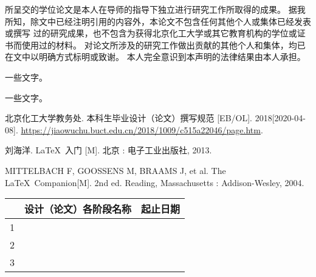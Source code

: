 \begin{declare}
	所呈交的学位论文是本人在导师的指导下独立进行研究工作所取得的成果。
	据我所知，除文中已经注明引用的内容外，本论文不包含任何其他个人或集体已经发表或撰写
	过的研究成果，也不包含为获得北京化工大学或其它教育机构的学位或证书而使用过的材料。
	对论文所涉及的研究工作做出贡献的其他个人和集体，均已在文中以明确方式标明或致谢。
	本人完全意识到本声明的法律结果由本人承担。
\end{declare}

\begin{taskbook}
\taskinfo		%
	
\taskitem			%
	一些文字。
	
\taskitem			%
	一些文字。
	
\taskitem			%
	\begin{bibenumerate}
		\item 北京化工大学教务处. 本科生毕业设计（论文）撰写规范 [EB/OL]. 2018[2020-04-08]. \url{https://jiaowuchu.buct.edu.cn/2018/1009/c515a22046/page.htm}.
		\item 刘海洋. \LaTeX\ 入门 [M]. 北京 : 电子工业出版社, 2013.
		\item MITTELBACH F, GOOSSENS M, BRAAMS J, et al. The \LaTeX\ Companion[M]. 2nd ed. Reading, Massachusetts : Addison-Wesley, 2004.
		\item 
	\end{bibenumerate}
	
\taskitem			%
	
	\begin{table}[ht]
		\centering
		\begin{tabularx}{.95\textwidth}{p{1.5em}Xp{6em}}
			\toprule
					& 	设计（论文）各阶段名称		  &		起止日期	\\\midrule
				1	& 								&				\\\hline
				2	&								&				\\\hline
				3	&								&				\\
			\bottomrule
		\end{tabularx}
	\end{table}
\end{taskbook}


%

